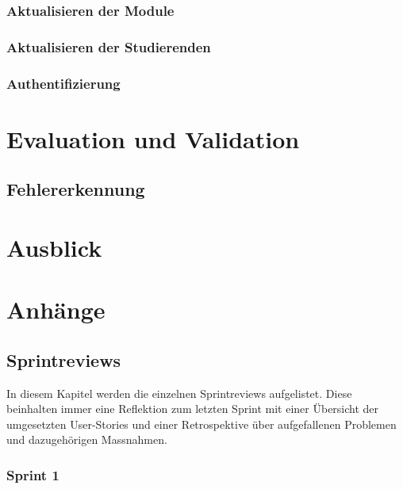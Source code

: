 \documentclass[a4paper, table]{article}
\begin{document}

\subsubsection{Aktualisieren der Module}


\subsubsection{Aktualisieren der Studierenden}


\subsubsection{Authentifizierung}

\newpage
\section{Evaluation und Validation}


\subsection{Fehlererkennung}

\section{Ausblick}


\newpage

\section{Anh\"ange}

\subsection{Sprintreviews}\label{Sprintreviews}
In diesem Kapitel werden die einzelnen Sprintreviews aufgelistet.
Diese beinhalten immer eine Reflektion zum letzten Sprint mit einer Übersicht der umgesetzten User-Stories und
einer Retrospektive über aufgefallenen Problemen und dazugehörigen Massnahmen.

\subsubsection{Sprint 1}
\end{document}
